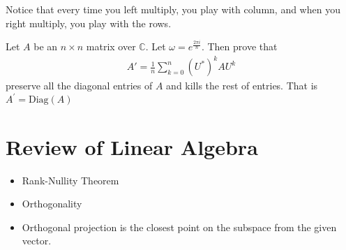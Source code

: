 Notice that every time you left multiply, you play with column, and
when you right multiply, you play with the rows.

\begin{exercise}
  Let $A$ be an $n \times n$ matrix over $\mathbb{C}$. Let $\omega =
  e^{ \frac{2\pi i}{n}}$. Then prove that
  \begin{align*}
    A' = \frac{1}{n} \sum_{k = 0}^{n} (U^*)^kAU^k
  \end{align*}
  preserve all the diagonal entries of $A$ and kills the rest of
  entries. That is $A^\prime = \text{Diag}(A)$
\end{exercise}

\section{Review of Linear Algebra}

\begin{itemize}
  \item Rank-Nullity Theorem
  \item Orthogonality
  \item Orthogonal projection is the closest point on the subspace
    from the given vector.
\end{itemize}
